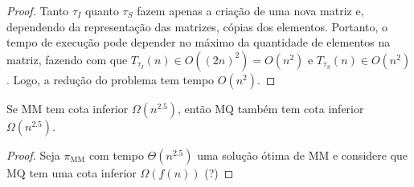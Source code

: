 \begin{proof}
    Tanto $\tau_I$ quanto $\tau_S$ fazem apenas a criação de uma nova matriz e, dependendo da representação das matrizes, cópias dos elementos. Portanto, o tempo de execução pode depender no máximo da quantidade de elementos na matriz, fazendo com que $T_{\tau_I}(n) \in O\left(\left(2n\right)^2\right) = O\left(n^2\right)$ e $T_{\tau_S}(n) \in O\left(n^2\right)$. Logo, a redução do problema tem tempo $O\left(n^2\right)$.
\end{proof}

\begin{theorem}
    Se MM tem cota inferior $\Omega\left(n^{2.5}\right)$, então MQ também tem cota inferior $\Omega\left(n^{2.5}\right)$.
\end{theorem}

\begin{proof}
    Seja $\pi_\text{MM}$ com tempo $\Theta\left(n^{2.5}\right)$ uma solução ótima de MM e considere que MQ tem uma cota inferior $\Omega(f(n))$ (?)
\end{proof}
